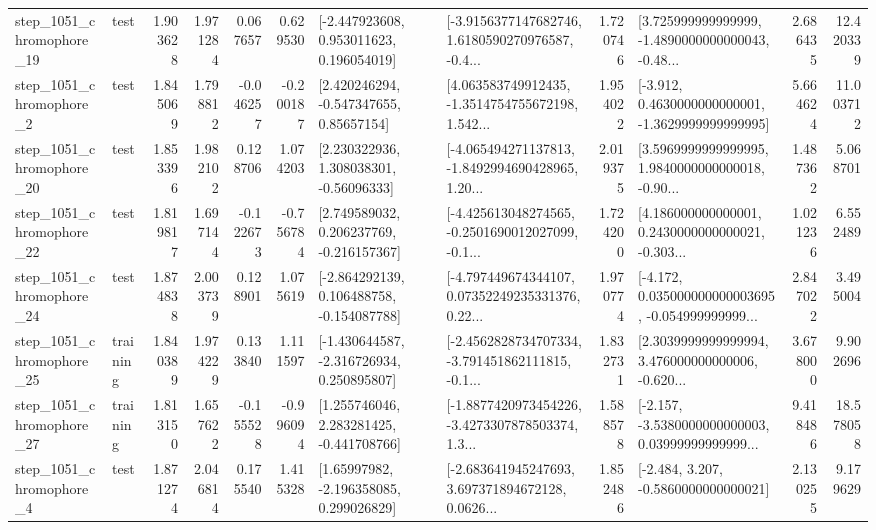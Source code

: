 \begin{tabular}{llrrrrllrlrr}
 step\_1051\_chromophore\_19 &      test &      1.903628 &    1.971284 &      0.067657 &  0.629530 &    [-2.447923608, 0.953011623, 0.196054019] &  [-3.9156377147682746, 1.6180590270976587, -0.4... &       1.720746 &  [3.725999999999999, -1.4890000000000043, -0.48... &            2.686435 &         12.420339 \\
  step\_1051\_chromophore\_2 &      test &      1.845069 &    1.798812 &     -0.046257 & -0.200187 &     [2.420246294, -0.547347655, 0.85657154] &  [4.063583749912435, -1.3514754755672198, 1.542... &       1.954022 &  [-3.912, 0.4630000000000001, -1.3629999999999995] &            5.664624 &         11.003712 \\
 step\_1051\_chromophore\_20 &      test &      1.853396 &    1.982102 &      0.128706 &  1.074203 &     [2.230322936, 1.308038301, -0.56096333] &  [-4.065494271137813, -1.8492994690428965, 1.20... &       2.019375 &  [3.5969999999999995, 1.9840000000000018, -0.90... &            1.487362 &          5.068701 \\
 step\_1051\_chromophore\_22 &      test &      1.819817 &    1.697144 &     -0.122673 & -0.756784 &    [2.749589032, 0.206237769, -0.216157367] &  [-4.425613048274565, -0.2501690012027099, -0.1... &       1.724200 &  [4.186000000000001, 0.2430000000000021, -0.303... &            1.021236 &          6.552489 \\
 step\_1051\_chromophore\_24 &      test &      1.874838 &    2.003739 &      0.128901 &  1.075619 &   [-2.864292139, 0.106488758, -0.154087788] &  [-4.797449674344107, 0.07352249235331376, 0.22... &       1.970774 &  [-4.172, 0.035000000000003695, -0.054999999999... &            2.847022 &          3.495004 \\
 step\_1051\_chromophore\_25 &  training &      1.840389 &    1.974229 &      0.133840 &  1.111597 &   [-1.430644587, -2.316726934, 0.250895807] &  [-2.4562828734707334, -3.791451862111815, -0.1... &       1.832731 &  [2.3039999999999994, 3.476000000000006, -0.620... &            3.678000 &          9.902696 \\
 step\_1051\_chromophore\_27 &  training &      1.813150 &    1.657622 &     -0.155528 & -0.996094 &    [1.255746046, 2.283281425, -0.441708766] &  [-1.8877420973454226, -3.4273307878503374, 1.3... &       1.588578 &  [-2.157, -3.5380000000000003, 0.03999999999999... &            9.418486 &         18.578058 \\
  step\_1051\_chromophore\_4 &      test &      1.871274 &    2.046814 &      0.175540 &  1.415328 &     [1.65997982, -2.196358085, 0.299026829] &  [-2.683641945247693, 3.697371894672128, 0.0626... &       1.852486 &               [-2.484, 3.207, -0.5860000000000021] &            2.130255 &          9.179629 \\

\end{tabular}
